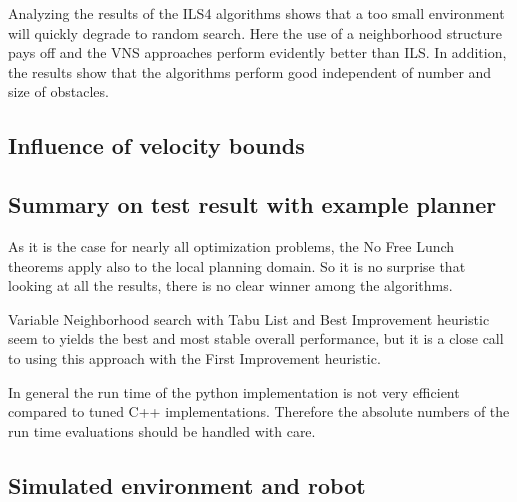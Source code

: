 Analyzing the results of the ILS4 algorithms shows that a too small environment will quickly degrade to random search. 
Here the use of a neighborhood structure pays off and the VNS approaches perform evidently better than ILS. 
In addition, the results show that the algorithms perform good independent of number and size of obstacles.

\subsection{Influence of velocity bounds}

\subsection{Summary on test result with example planner}
As it is the case for nearly all optimization problems, the No Free Lunch theorems \cite{wolpert1997no} apply also to the local planning domain. 
So it is no surprise that looking at all the results, there is no clear winner among the algorithms. 

Variable Neighborhood search with Tabu List and Best Improvement heuristic seem to yields the best and most stable overall performance, but it is a close call to using this approach with the First Improvement heuristic.

In general the run time of the python implementation is not very efficient compared to tuned C++ implementations. 
Therefore the absolute numbers of the run time evaluations should be handled with care.

\subsection{Simulated environment and robot}
